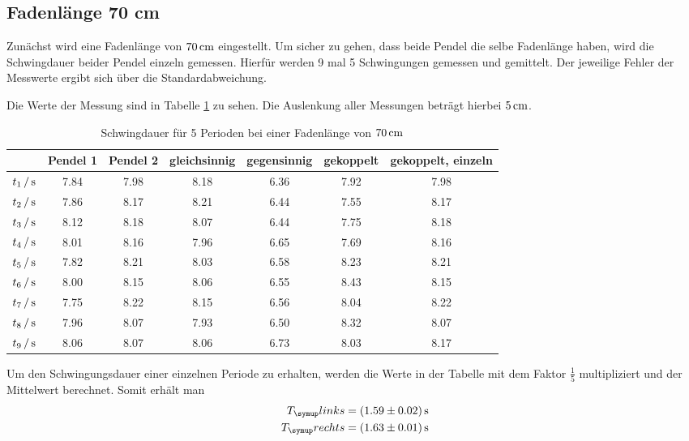 \subsection{Fadenlänge 70 cm}

Zunächst wird eine Fadenlänge von $70\,\si{\centi\meter}$ eingestellt. Um sicher zu gehen, dass
beide Pendel die selbe Fadenlänge haben, wird die Schwingdauer beider Pendel
einzeln gemessen. Hierfür werden 9 mal 5 Schwingungen gemessen und gemittelt.
Der jeweilige Fehler der Messwerte ergibt sich über die Standardabweichung.

Die Werte der Messung sind in Tabelle \ref{tab:70cm} zu sehen. Die Auslenkung
aller Messungen beträgt hierbei $5\,\si{\centi\meter}$.
\begin{table}[H]
  \centering
  \begin{tabular}{c | c c c c c c}
    \toprule
    &Pendel 1& Pendel 2 & gleichsinnig & gegensinnig &gekoppelt&
    gekoppelt, einzeln \\
    \midrule
    $t_1\,/\,\si{\second}$ & 7.84 & 7.98 & 8.18 & 6.36 & 7.92 & 7.98 \\
    $t_2\,/\,\si{\second}$ & 7.86 & 8.17 & 8.21 & 6.44 & 7.55 & 8.17 \\
    $t_3\,/\,\si{\second}$ & 8.12 & 8.18 & 8.07 & 6.44 & 7.75 & 8.18 \\
    $t_4\,/\,\si{\second}$ & 8.01 & 8.16 & 7.96 & 6.65 & 7.69 & 8.16 \\
    $t_5\,/\,\si{\second}$ & 7.82 & 8.21 & 8.03 & 6.58 & 8.23 & 8.21 \\
    $t_6\,/\,\si{\second}$ & 8.00 & 8.15 & 8.06 & 6.55 & 8.43 & 8.15 \\
    $t_7\,/\,\si{\second}$ & 7.75 & 8.22 & 8.15 & 6.56 & 8.04 & 8.22 \\
    $t_8\,/\,\si{\second}$ & 7.96 & 8.07 & 7.93 & 6.50 & 8.32 & 8.07 \\
    $t_9\,/\,\si{\second}$ & 8.06 & 8.07 & 8.06 & 6.73 & 8.03 & 8.17 \\
    \bottomrule
  \end{tabular}
  \caption{Schwingdauer für 5 Perioden bei einer Fadenlänge von $70\,\si{\centi\meter}$}
  \label{tab:70cm}
\end{table}
Um den Schwingungsdauer einer einzelnen Periode zu erhalten, werden die Werte
in der Tabelle mit dem Faktor $\frac{1}{5}$ multipliziert und der Mittelwert
berechnet. Somit erhält man
\begin{align*}
T_\su{links}&=(1.59\pm0.02)\sek \\
T_\su{rechts}&=(1.63\pm0.01)\sek
\end{align*}

